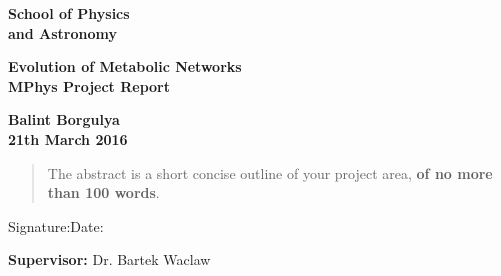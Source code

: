 \documentclass[a4paper,12pt]{article}
\begin{document}
\epsfxsize=40mm
\begin{minipage}[b]{110mm}
	{\Huge\bf School of Physics \\and Astronomy
		\vspace*{17mm}}
\end{minipage}
\hfill
\begin{minipage}[t]{40mm}
\end{minipage}
\par\noindent
\vspace*{2cm}
\begin{center}
	\Large\bf Evolution of Metabolic Networks\\
	\Large\bf MPhys Project  Report
\end{center}
\vspace*{1.5cm}
\begin{center}
	\bf Balint Borgulya\\
	21th March 2016
\end{center}
\vspace*{5mm}



\begin{abstract}
	The abstract is a short concise outline of your 
	project area, {\bf of no more than 100 words}.
\end{abstract}

\vspace*{1cm}

\vspace*{3cm}
Signature:\hspace*{8cm}Date:

\vfill
{\bf Supervisor:} Dr. Bartek Waclaw
\newpage



\setcounter{page}{1}
\footruleheight{1pt}
\headruleheight{1pt}
\rhead{- \thepage}
\cfoot{}

\cleardoublepage
\tableofcontents
\end{document}
